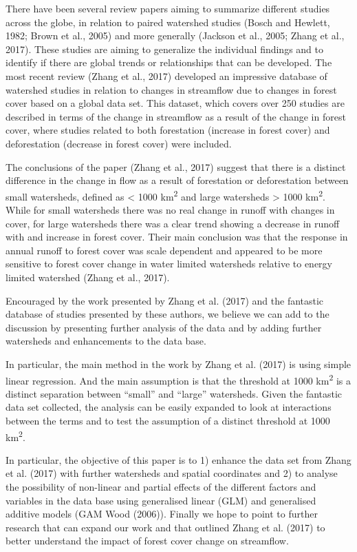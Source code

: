 \documentclass[]{elsarticle} %
\begin{document}
There have been several review papers aiming to summarize different
studies across the globe, in relation to paired watershed studies (Bosch
and Hewlett, 1982; Brown et al., 2005) and more generally (Jackson et
al., 2005; Zhang et al., 2017). These studies are aiming to generalize
the individual findings and to identify if there are global trends or
relationships that can be developed. The most recent review (Zhang et
al., 2017) developed an impressive database of watershed studies in
relation to changes in streamflow due to changes in forest cover based
on a global data set. This dataset, which covers over 250 studies are
described in terms of the change in streamflow as a result of the change
in forest cover, where studies related to both forestation (increase in
forest cover) and deforestation (decrease in forest cover) were
included.

The conclusions of the paper (Zhang et al., 2017) suggest that there is
a distinct difference in the change in flow as a result of forestation
or deforestation between small watersheds, defined as \textless{} 1000
km\textsuperscript{2} and large watersheds \textgreater{} 1000
km\textsuperscript{2}. While for small watersheds there was no real
change in runoff with changes in cover, for large watersheds there was a
clear trend showing a decrease in runoff with and increase in forest
cover. Their main conclusion was that the response in annual runoff to
forest cover was scale dependent and appeared to be more sensitive to
forest cover change in water limited watersheds relative to energy
limited watershed (Zhang et al., 2017).

Encouraged by the work presented by Zhang et al. (2017) and the
fantastic database of studies presented by these authors, we believe we
can add to the discussion by presenting further analysis of the data and
by adding further watersheds and enhancements to the data base.

In particular, the main method in the work by Zhang et al. (2017) is
using simple linear regression. And the main assumption is that the
threshold at 1000 km\textsuperscript{2} is a distinct separation between
``small'' and ``large'' watersheds. Given the fantastic data set
collected, the analysis can be easily expanded to look at interactions
between the terms and to test the assumption of a distinct threshold at
1000 km\textsuperscript{2}.

In particular, the objective of this paper is to 1) enhance the data set
from Zhang et al. (2017) with further watersheds and spatial coordinates
and 2) to analyse the possibility of non-linear and partial effects of
the different factors and variables in the data base using generalised
linear (GLM) and generalised additive models (GAM Wood (2006)). Finally
we hope to point to further research that can expand our work and that
outlined Zhang et al. (2017) to better understand the impact of forest
cover change on streamflow.
\end{document}
